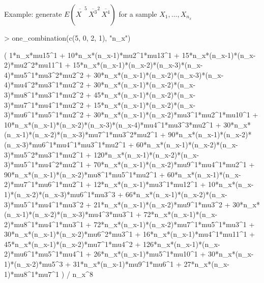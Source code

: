 \documentclass[12pt]{article}
\begin{document}
Example: generate $E\left(\overline{X^{\phantom{1}}}^5 \, \overline{X^3}^2 \, \overline{X^4}\right)$ for a sample $X_1, \dotsc, X_{n_x}$
\begin{Schunk}
\begin{Sinput}
> one_combination(c(5, 0, 2, 1), "n_x")
\end{Sinput}
\end{Schunk}
\begin{Schunk}
\begin{Soutput}
( 1*n_x*mu15^1 + 10*n_x*(n_x-1)*mu2^1*mu13^1 +
15*n_x*(n_x-1)*(n_x-2)*mu2^2*mu11^1 +
15*n_x*(n_x-1)*(n_x-2)*(n_x-3)*(n_x-4)*mu5^1*mu3^2*mu2^2 +
30*n_x*(n_x-1)*(n_x-2)*(n_x-3)*(n_x-4)*mu4^2*mu3^1*mu2^2 +
30*n_x*(n_x-1)*(n_x-2)*(n_x-3)*mu8^1*mu3^1*mu2^2 +
45*n_x*(n_x-1)*(n_x-2)*(n_x-3)*mu7^1*mu4^1*mu2^2 +
15*n_x*(n_x-1)*(n_x-2)*(n_x-3)*mu6^1*mu5^1*mu2^2 +
30*n_x*(n_x-1)*(n_x-2)*mu3^1*mu2^1*mu10^1 +
10*n_x*(n_x-1)*(n_x-2)*(n_x-3)*(n_x-4)*mu4^1*mu3^3*mu2^1 +
30*n_x*(n_x-1)*(n_x-2)*(n_x-3)*mu7^1*mu3^2*mu2^1 +
90*n_x*(n_x-1)*(n_x-2)*(n_x-3)*mu6^1*mu4^1*mu3^1*mu2^1 +
60*n_x*(n_x-1)*(n_x-2)*(n_x-3)*mu5^2*mu3^1*mu2^1 +
120*n_x*(n_x-1)*(n_x-2)*(n_x-3)*mu5^1*mu4^2*mu2^1 +
70*n_x*(n_x-1)*(n_x-2)*mu9^1*mu4^1*mu2^1 +
90*n_x*(n_x-1)*(n_x-2)*mu8^1*mu5^1*mu2^1 +
60*n_x*(n_x-1)*(n_x-2)*mu7^1*mu6^1*mu2^1 + 12*n_x*(n_x-1)*mu3^1*mu12^1
+ 10*n_x*(n_x-1)*(n_x-2)*(n_x-3)*mu6^1*mu3^3 +
66*n_x*(n_x-1)*(n_x-2)*(n_x-3)*mu5^1*mu4^1*mu3^2 +
21*n_x*(n_x-1)*(n_x-2)*mu9^1*mu3^2 +
30*n_x*(n_x-1)*(n_x-2)*(n_x-3)*mu4^3*mu3^1 +
72*n_x*(n_x-1)*(n_x-2)*mu8^1*mu4^1*mu3^1 +
72*n_x*(n_x-1)*(n_x-2)*mu7^1*mu5^1*mu3^1 +
30*n_x*(n_x-1)*(n_x-2)*mu6^2*mu3^1 + 16*n_x*(n_x-1)*mu4^1*mu11^1 +
45*n_x*(n_x-1)*(n_x-2)*mu7^1*mu4^2 +
126*n_x*(n_x-1)*(n_x-2)*mu6^1*mu5^1*mu4^1 + 26*n_x*(n_x-1)*mu5^1*mu10^1
+ 30*n_x*(n_x-1)*(n_x-2)*mu5^3 + 31*n_x*(n_x-1)*mu9^1*mu6^1 +
27*n_x*(n_x-1)*mu8^1*mu7^1 ) / n_x^8
\end{Soutput}
\end{Schunk}
\end{document}
